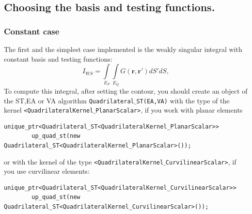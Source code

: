 \documentclass[a4wide,11pt]{article}
\renewcommand{\[}{\begin{equation}}
\renewcommand{\]}{\end{equation}}
\renewcommand{\{}{\begin{eqnarray}}
\renewcommand{\}}{\end{eqnarray}}
\renewcommand{\vec}{\mathbf}
\begin{document}
\subsection{Choosing the basis and testing functions.}
\subsubsection*{Constant case}
The first and the simplest case implemented is the weakly singular integral with constant basis and testing functions:
\[
\label{I_const_quad}
I_{WS} = \int\limits_{E_P}\int\limits_{E_Q} G(\vec r, \vec r') dS' dS,
\] 
To compute this integral, after setting the contour, you should create an object of the ST,EA or VA algorithm \texttt{Quadrilateral$\_$ST(EA,VA)} with the type of the kernel \texttt{<QuadrilateralKernel$\_$PlanarScalar>}, if you work with planar elements
\begin{verbatim}
unique_ptr<Quadrilateral_ST<QuadrilateralKernel_PlanarScalar>> 
        up_quad_st(new Quadrilateral_ST<QuadrilateralKernel_PlanarScalar>());
\end{verbatim}
or with the kernel of the type \texttt{<QuadrilateralKernel$\_$CurvilinearScalar>}, if you use curvilinear elements:
\begin{verbatim}
unique_ptr<Quadrilateral_ST<QuadrilateralKernel_CurvilinearScalar>> 
        up_quad_st(new Quadrilateral_ST<QuadrilateralKernel_CurvilinearScalar>());
\end{verbatim}
\end{document}
